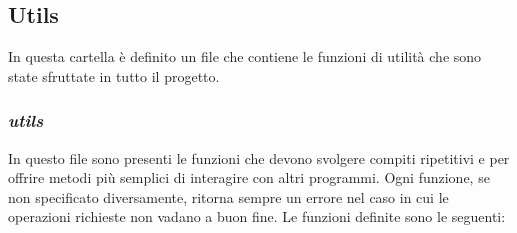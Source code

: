 \subsection{Utils}

In questa cartella è definito un file che contiene le funzioni di utilità che
sono state sfruttate in tutto il progetto.

\subsubsection{\emph{utils}}

In questo file sono presenti le funzioni che devono svolgere compiti ripetitivi
e per offrire metodi più semplici di interagire con altri programmi. Ogni
funzione, se non specificato diversamente, ritorna sempre un errore nel caso in
cui le operazioni richieste non vadano a buon fine. Le funzioni
definite sono le seguenti:
